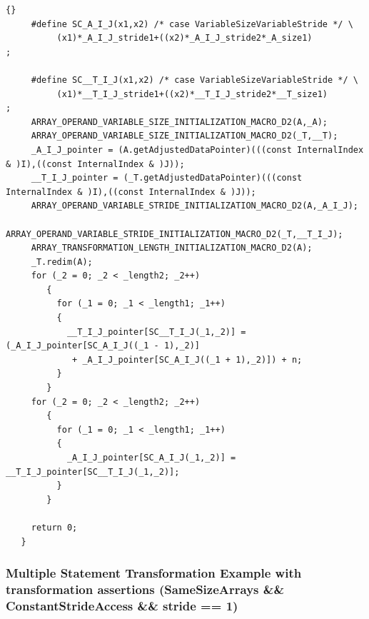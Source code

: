 \documentclass[10pt]{article}
\begin{document}
\begin{lstlisting}{}
     #define SC_A_I_J(x1,x2) /* case VariableSizeVariableStride */ \
          (x1)*_A_I_J_stride1+((x2)*_A_I_J_stride2*_A_size1)
; 
        
     #define SC__T_I_J(x1,x2) /* case VariableSizeVariableStride */ \
          (x1)*__T_I_J_stride1+((x2)*__T_I_J_stride2*__T_size1)
; 
     ARRAY_OPERAND_VARIABLE_SIZE_INITIALIZATION_MACRO_D2(A,_A); 
     ARRAY_OPERAND_VARIABLE_SIZE_INITIALIZATION_MACRO_D2(_T,__T); 
     _A_I_J_pointer = (A.getAdjustedDataPointer)(((const InternalIndex & )I),((const InternalIndex & )J)); 
     __T_I_J_pointer = (_T.getAdjustedDataPointer)(((const InternalIndex & )I),((const InternalIndex & )J)); 
     ARRAY_OPERAND_VARIABLE_STRIDE_INITIALIZATION_MACRO_D2(A,_A_I_J); 
     ARRAY_OPERAND_VARIABLE_STRIDE_INITIALIZATION_MACRO_D2(_T,__T_I_J); 
     ARRAY_TRANSFORMATION_LENGTH_INITIALIZATION_MACRO_D2(A); 
     _T.redim(A); 
     for (_2 = 0; _2 < _length2; _2++)
        { 
          for (_1 = 0; _1 < _length1; _1++)
          { 
            __T_I_J_pointer[SC__T_I_J(_1,_2)] = (_A_I_J_pointer[SC_A_I_J((_1 - 1),_2)]
             + _A_I_J_pointer[SC_A_I_J((_1 + 1),_2)]) + n; 
          } 
        } 
     for (_2 = 0; _2 < _length2; _2++)
        { 
          for (_1 = 0; _1 < _length1; _1++)
          { 
            _A_I_J_pointer[SC_A_I_J(_1,_2)] = __T_I_J_pointer[SC__T_I_J(_1,_2)]; 
          } 
        } 

     return 0;
   } 

\end{lstlisting}

\subsubsection{Multiple Statement Transformation Example with transformation assertions (SameSizeArrays \&\& ConstantStrideAccess \&\& stride == 1)}
\end{document}
